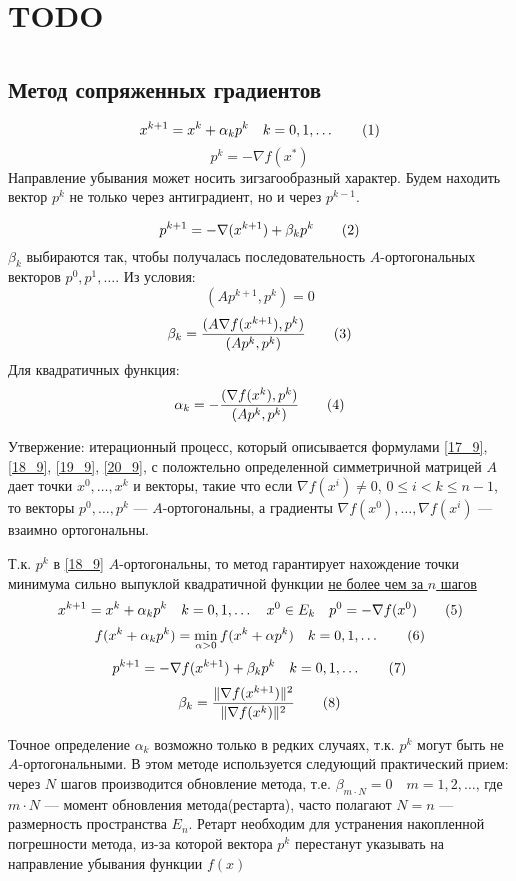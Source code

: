 \documentclass[oneside]{book}
\newcommand\addtag{\refstepcounter{equation}\tag{\theequation}}
\theoremstyle{plain}
\theoremstyle{remark}
\theoremstyle{definition}
\begin{document}
\chapter{TODO}
\label{sec:orgf841f3b}
\chapter{}
\label{sec:orgb65a53a}
\section{Метод сопряженных градиентов}
\label{sec:org7915265}
\[ x^{k + 1} = x^k + \alpha_k p^k \quad k = 0,1,\dots \addtag\label{17_9}\]
\[ p^k = - \nabla f(x^*) \]
Направление убывания может носить зигзагообразный характер. Будем находить вектор \(p^k\) не только через антиградиент, но и через \(p^{k - 1}\).

\[ p^{k + 1} = - \nabla(x^{k + 1}) + \beta_k p^k \addtag\label{18_9}\]
\(\beta_k\) выбираются так, чтобы получалась последовательность \(A\)-ортогональных векторов \(p^0, p^1, \dots\). Из условия:
\[ (Ap^{k + 1}, p^k) = 0 \]
\[ \beta_k = \frac{(A \nabla f(x^{k + 1}), p^k)}{(Ap^k, p^k)} \addtag\label{19_9}\]
Для квадратичных функция:
\[ \alpha_k = -\frac{(\nabla f(x^k), p^k)}{(Ap^k, p^k)} \addtag\label{20_9}\]

Утвержение: итерационный процесс, который описывается формулами \ref{17_9}, \ref{18_9}, \ref{19_9}, \ref{20_9}, с положтельно определенной симметричной матрицей \(A\) дает точки \(x^0,\dots,x^k\) и векторы, такие что если \(\nabla f(x^i) \neq 0\), \(0 \le i < k \le n - 1\), то векторы \(p^0,\dots,p^k\) --- \(A\)-ортогональны, а градиенты \(\nabla f(x^0), \dots, \nabla f(x^i)\) --- взаимно ортогональны.

Т.к. \(p^k\) в \ref{18_9} \(A\)-ортогональны, то метод гарантирует нахождение точки минимума сильно выпуклой квадратичной функции \uline{не более чем за \(n\) шагов}
\[ x^{k + 1} = x^k + \alpha_k p^k \quad k = 0,1,\dots\quad x^0 \in E_k\quad p^0 = - \nabla f(x^0) \addtag\label{21_9}\]
\[ f(x^k + \alpha_k p^k) = \min_{\alpha > 0} f(x^k + \alpha p^k)\quad k = 0,1, \dots \addtag\label{22_9}\]
\[ p^{k + 1} = -\nabla f(x^{k + 1}) + \beta_k p^k\quad k = 0,1,\dots \addtag\label{23_9}\]
\[ \beta_k = \frac{\Vert \nabla f(x^{k + 1}) \Vert ^2}{\Vert \nabla f(x^k) \Vert ^2} \addtag\label{24_9}\]

Точное определение \(\alpha_k\) возможно только в редких случаях, т.к. \(p^k\) могут быть не \(A\)-ортогональными. В этом методе используется следующий практический прием: через \(N\) шагов производится обновление метода, т.е. \(\beta_{m\cdot N} = 0\quad m = 1, 2, \dots\), где \(m\cdot N\) --- момент обновления метода(рестарта), часто полагают \(N = n\) --- размерность пространства \(E_n\). Ретарт необходим для устранения накопленной погрешности метода, из-за которой вектора \(p^k\) перестанут указывать на направление убывания функции \(f(x)\) 
\end{document}
